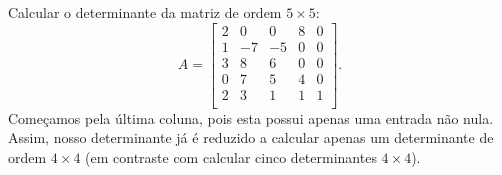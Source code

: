 \begin{ex}\label{exp:det2}
Calcular o determinante da matriz de ordem $5 \times 5$:
\begin{equation}
A =
\begin{bmatrix}
2 & 0 & 0 & 8 & 0 \\
1 & -7 & -5 & 0 & 0 \\
3 & 8 & 6 & 0 & 0 \\
0 & 7 & 5 & 4 & 0 \\
2 & 3 & 1 & 1 & 1 \\
\end{bmatrix}.
\end{equation} Começamos pela última coluna, pois esta possui apenas uma entrada não nula. Assim, nosso determinante já é reduzido a calcular apenas um determinante de ordem $4 \times 4$ (em contraste com calcular cinco determinantes $4\times 4$).


\end{ex}
